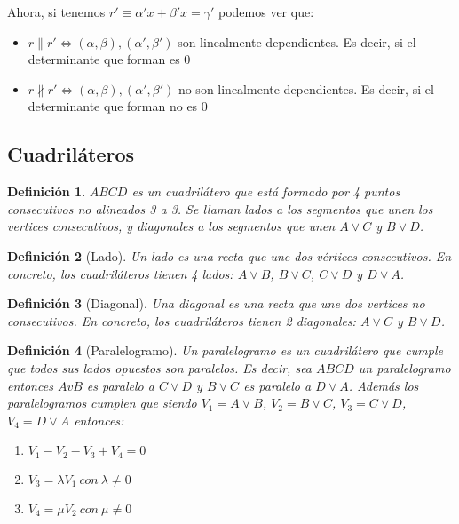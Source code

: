 \documentclass[11pt, a4paper, titlepage]{article}
\theoremstyle{theorem-style}
\theoremstyle{definition-style}
\newtheorem*{ndef}{Definición}
\theoremstyle{remark-style}
\theoremstyle{example-style}
\newenvironment{nlist}
{\begin{enumerate}
    \renewcommand\labelenumi{(\emph{\roman{enumi})}}}
  {\end{enumerate}}
\begin{document}
Ahora, si tenemos $r'\equiv \alpha' x + \beta' x = \gamma '$ podemos ver que:
\begin{itemize}
\item $r \parallel r' \iff (\alpha,\beta), (\alpha',\beta') $ son linealmente dependientes. Es decir, si el determinante que forman es $0$

\item $r \nparallel r'\iff (\alpha,\beta), (\alpha',\beta') $ no son linealmente dependientes. Es decir, si el determinante que forman no es $0$
\end{itemize}

\subsection{Cuadriláteros}

\begin{ndef}
  $ABCD$ es un cuadrilátero que está formado por 4 puntos consecutivos no alineados 3 a 3. Se llaman lados a los segmentos que unen los vertices consecutivos, y diagonales a los segmentos que unen $A \vee C$ y $B \vee D$.
\end{ndef}

\begin{ndef}[Lado]
  Un lado es una recta que une dos vértices consecutivos. En concreto, los cuadriláteros tienen 4 lados: $A \vee B$, $B \vee C$, $C \vee D$
  y $D \vee A$.
\end{ndef}

\begin{ndef}[Diagonal]
  Una diagonal es una recta que une dos vertices no consecutivos. En concreto, los cuadriláteros tienen 2 diagonales: $A \vee C$ y $B \vee D$.
\end{ndef}

\begin{ndef}[Paralelogramo]
  Un paralelogramo es un cuadrilátero que cumple que todos sus lados opuestos son paralelos. Es decir, sea $ABCD$ un
  paralelogramo entonces $AvB$ es paralelo a $C \vee D$ y $B \vee C$ es paralelo a $D \vee A$. Además los paralelogramos cumplen que
  siendo $V_{1} = A \vee B$, $V_{2} = B \vee C$, $V_{3} = C\vee D$, $V_{4} = D \vee A$ entonces:
  \begin{nlist}
  \item $V_{1} - V_{2} - V_{3} + V_{4} = 0$
  \item $V_{3} = \lambda V_{1}\ con\ \lambda \neq 0$
  \item $V_{4} = \mu V_{2}\ con\ \mu \neq 0$
  \end{nlist}
\end{ndef}
\end{document}
